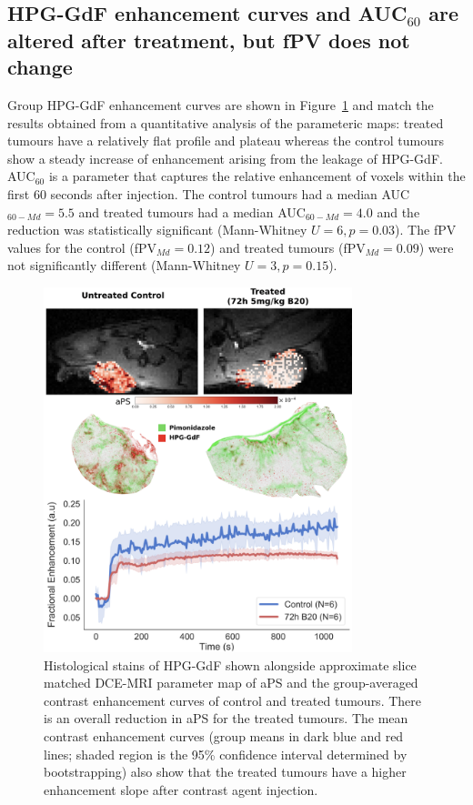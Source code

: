 \subsection{\acs{HPG-GdF} enhancement curves and \acs{AUC}$_{60}$ are altered after treatment, but \acs{fPV} does not change}

Group \acs{HPG-GdF} enhancement curves are shown in Figure~\ref{hpg:aPShistoEC} and match the results obtained from a quantitative analysis of the parameteric maps: treated tumours have a relatively flat profile and plateau whereas the control tumours show a steady increase of enhancement arising from the leakage of \acs{HPG-GdF}.
\acs{AUC}$_{60}$ is a parameter that captures the relative enhancement of voxels within the first 60 seconds after injection.
The control tumours had a median \acs{AUC}$_{60-Md} = 5.5$ and treated tumours had a median \acs{AUC}$_{60-Md} = 4.0$ and the reduction was statistically significant (Mann-Whitney $U = 6, p = 0.03$).
The \acs{fPV} values for the control (fPV$_{Md} = 0.12$) and treated tumours (fPV$_{Md} = 0.09$) were not significantly different (Mann-Whitney $U = 3, p = 0.15$).

\begin{figure}[htbp] %
  \centering
  \includegraphics[width=0.8\textwidth]{hpg/hpg-B20-images/hpg_aPShisto_ec.png} 
  \captionsetup{width=\linewidth}
  \caption{Histological stains of \acs{HPG-GdF} shown alongside approximate slice matched \acs{DCE-MRI} parameter map of \acs{aPS} and the group-averaged contrast enhancement curves of control and treated tumours. There is an overall reduction in \acs{aPS} for the treated tumours. The mean contrast enhancement curves (group means in dark blue and red lines; shaded region is the 95\% confidence interval determined by bootstrapping) also show that the treated tumours have a higher enhancement slope after contrast agent injection.}
  \label{hpg:aPShistoEC}
\end{figure}

